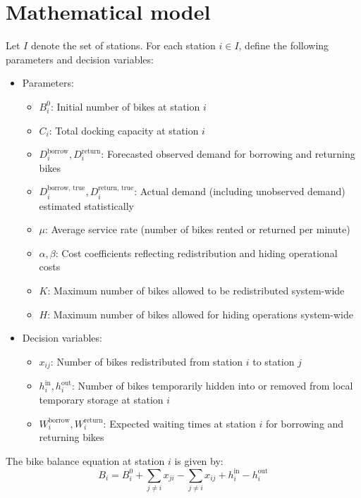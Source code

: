 \documentclass[11pt,a4paper]{article}
\begin{document}
\section{Mathematical model}

Let $I$ denote the set of stations. For each station $i \in I$, define the following parameters and decision variables:

\begin{itemize}
    \item Parameters:
    \begin{itemize}
        \item $B_i^0$: Initial number of bikes at station $i$
        \item $C_i$: Total docking capacity at station $i$
        \item $D_i^{\text{borrow}}, D_i^{\text{return}}$: Forecasted observed demand for borrowing and returning bikes
        \item $D_i^{\text{borrow, true}}, D_i^{\text{return, true}}$: Actual demand (including unobserved demand) estimated statistically
        \item $\mu$: Average service rate (number of bikes rented or returned per minute)
        \item $\alpha, \beta$: Cost coefficients reflecting redistribution and hiding operational costs
        \item $K$: Maximum number of bikes allowed to be redistributed system-wide
        \item $H$: Maximum number of bikes allowed for hiding operations system-wide
    \end{itemize}

    \item Decision variables:
    \begin{itemize}
        \item $x_{ij}$: Number of bikes redistributed from station $i$ to station $j$
        \item $h_i^{\text{in}}, h_i^{\text{out}}$: Number of bikes temporarily hidden into or removed from local temporary storage at station $i$
        \item $W_i^{\text{borrow}}, W_i^{\text{return}}$: Expected waiting times at station $i$ for borrowing and returning bikes
    \end{itemize}
\end{itemize}

The bike balance equation at station $i$ is given by:
\[
B_i = B_i^0 + \sum_{j \ne i} x_{ji} - \sum_{j \ne i} x_{ij} + h_i^{\text{in}} - h_i^{\text{out}}
\]
\end{document}
